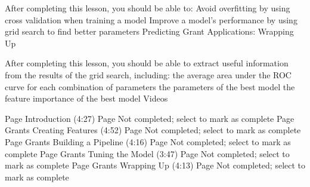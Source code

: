After completing this lesson, you should be able to:
Avoid overfitting by using cross validation when training a model
Improve a model’s performance by using grid search to find better parameters
Predicting Grant Applications: Wrapping Up

After completing this lesson, you should be able to extract useful information from the results of the grid search, including:
the average area under the ROC curve for each combination of parameters
the parameters of the best model
the feature importance of the best model
Videos

Page Introduction (4:27) Page Not completed; select to mark as complete
Page Grants Creating Features (4:52) Page Not completed; select to mark as complete
Page Grants Building a Pipeline (4:16) Page Not completed; select to mark as complete
Page Grants Tuning the Model (3:47) Page Not completed; select to mark as complete
Page Grants Wrapping Up (4:13) Page Not completed; select to mark as complete



